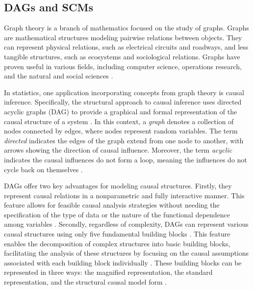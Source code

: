 \documentclass[
  authoryear,
  preprint,
  1p]{elsarticle}
\begin{document}
\subsection{DAGs and SCMs}\label{sec-framework-dag}

Graph theory is a branch of mathematics focused on the study of graphs.
Graphs are mathematical structures modeling pairwise relations between
objects. They can represent physical relations, such as electrical
circuits and roadways, and less tangible structures, such as ecosystems
and sociological relations. Graphs have proven useful in various fields,
including computer science, operations research, and the natural and
social sciences \citep{Gross_et_al_2018}.

In statistics, one application incorporating concepts from graph theory
is causal inference. Specifically, the structural approach to causal
inference uses directed acyclic graphs (DAG) to provide a graphical and
formal representation of the causal structure of a system
\citep{Neal_2020}. In this context, a \emph{graph} denotes a collection
of nodes connected by edges, where nodes represent random variables. The
term \emph{directed} indicates the edges of the graph extend from one
node to another, with arrows showing the direction of causal influence.
Moreover, the term \emph{acyclic} indicates the causal influences do not
form a loop, meaning the influences do not cycle back on themselves
\citep{McElreath_2020}.

DAGs offer two key advantages for modeling causal structures. Firstly,
they represent causal relations in a nonparametric and fully interactive
manner. This feature allows for feasible causal analysis strategies
without needing the specification of the type of data or the nature of
the functional dependence among variables \citep{Morgan_et_al_2014}.
Secondly, regardless of complexity, DAGs can represent various causal
structures using only five fundamental building blocks
\citep{Neal_2020, McElreath_2020}. This feature enables the
decomposition of complex structures into basic building blocks,
facilitating the analysis of these structures by focusing on the causal
assumptions associated with each building block individually
\citep{McElreath_2020}. These building blocks can be represented in
three ways: the magnified representation, the standard representation,
and the structural causal model form \citep[SCM,][]{Morgan_et_al_2014}.

\newcommand{\dsep}{\perp\!\!\!\perp}
\newcommand{\ndsep}{\not\!\perp\!\!\!\perp}
\end{document}
